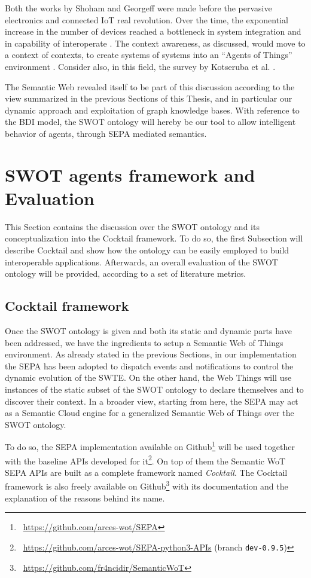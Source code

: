Both the works by Shoham and Georgeff were made before the pervasive electronics and connected IoT real revolution. Over the time, the exponential increase in the number of devices reached a bottleneck in system integration and in capability of interoperate \cite{al2015toward, hossain2015towards}. The context awareness, as discussed, would move to a context of contexts, to create systems of systems into an ``Agents of Things'' environment \cite{mzahm2013agents}. Consider also, in this field, the survey by Kotseruba et al. \cite{kotseruba201840}.

The Semantic Web revealed itself to be part of this discussion according to the view summarized in the previous Sections of this Thesis, and in particular our dynamic approach and exploitation of graph knowledge bases. With reference to the BDI model, the SWOT ontology will hereby be our tool to allow intelligent behavior of agents, through SEPA mediated semantics.

\section{SWOT agents framework and Evaluation}
\label{ssec:cocktail}

This Section contains the discussion over the SWOT ontology and its conceptualization into the Cocktail framework. To do so, the first Subsection will describe Cocktail and show how the ontology can be easily employed to build interoperable applications. Afterwards, an overall evaluation of the SWOT ontology will be provided, according to a set of literature metrics.

\subsection{Cocktail framework}
\label{ssec:cocktail_framework}
Once the SWOT ontology is given and both its static and dynamic parts have been addressed, we have the ingredients to setup a Semantic Web of Things environment. As already stated in the previous Sections, in our implementation the SEPA has been adopted to dispatch events and notifications to control the dynamic evolution of the SWTE. On the other hand, the Web Things will use instances of the static subset of the SWOT ontology to declare themselves and to discover their context. In a broader view, starting from here, the SEPA may act as a Semantic Cloud engine for a generalized Semantic Web of Things over the SWOT ontology.

To do so, the SEPA implementation available on Github\footnote{\faGithub~\url{https://github.com/arces-wot/SEPA}} will be used together with the baseline APIs developed for it\footnote{\faGithub~\url{https://github.com/arces-wot/SEPA-python3-APIs} (branch \texttt{dev-0.9.5})}. On top of them the Semantic WoT SEPA APIs are built as a complete framework named \textit{Cocktail}. The Cocktail framework is also freely available on Github\footnote{\faGithub~\url{https://github.com/fr4ncidir/SemanticWoT}} with its documentation and the explanation of the reasons behind its name. 

